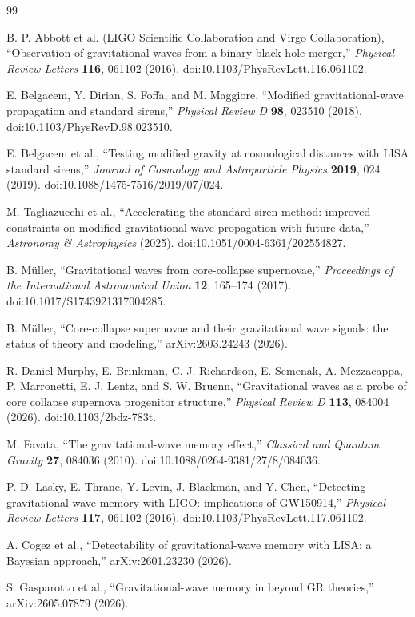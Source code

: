 \documentclass[11pt]{article}
\begin{document}
\begin{thebibliography}{99}

B. P. Abbott et al. (LIGO Scientific Collaboration and Virgo Collaboration), ``Observation of gravitational waves from a binary black hole merger,'' \emph{Physical Review Letters} \textbf{116}, 061102 (2016). doi:10.1103/PhysRevLett.116.061102.

E. Belgacem, Y. Dirian, S. Foffa, and M. Maggiore, ``Modified gravitational-wave propagation and standard sirens,'' \emph{Physical Review D} \textbf{98}, 023510 (2018). doi:10.1103/PhysRevD.98.023510.

E. Belgacem et al., ``Testing modified gravity at cosmological distances with LISA standard sirens,'' \emph{Journal of Cosmology and Astroparticle Physics} \textbf{2019}, 024 (2019). doi:10.1088/1475-7516/2019/07/024.

M. Tagliazucchi et al., ``Accelerating the standard siren method: improved constraints on modified gravitational-wave propagation with future data,'' \emph{Astronomy \& Astrophysics} (2025). doi:10.1051/0004-6361/202554827.

B. M{\"u}ller, ``Gravitational waves from core-collapse supernovae,'' \emph{Proceedings of the International Astronomical Union} \textbf{12}, 165--174 (2017). doi:10.1017/S1743921317004285.

B. M{\"u}ller, ``Core-collapse supernovae and their gravitational wave signals: the status of theory and modeling,'' arXiv:2603.24243 (2026).

R. Daniel Murphy, E. Brinkman, C. J. Richardson, E. Semenak, A. Mezzacappa, P. Marronetti, E. J. Lentz, and S. W. Bruenn, ``Gravitational waves as a probe of core collapse supernova progenitor structure,'' \emph{Physical Review D} \textbf{113}, 084004 (2026). doi:10.1103/2bdz-783t.

M. Favata, ``The gravitational-wave memory effect,'' \emph{Classical and Quantum Gravity} \textbf{27}, 084036 (2010). doi:10.1088/0264-9381/27/8/084036.

P. D. Lasky, E. Thrane, Y. Levin, J. Blackman, and Y. Chen, ``Detecting gravitational-wave memory with LIGO: implications of GW150914,'' \emph{Physical Review Letters} \textbf{117}, 061102 (2016). doi:10.1103/PhysRevLett.117.061102.

A. Cogez et al., ``Detectability of gravitational-wave memory with LISA: a Bayesian approach,'' arXiv:2601.23230 (2026).

S. Gasparotto et al., ``Gravitational-wave memory in beyond GR theories,'' arXiv:2605.07879 (2026).

\end{thebibliography}
\end{document}
